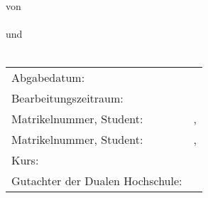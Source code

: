 \thispagestyle{empty}
\begin{titlepage}
\enlargethispage{4cm}

\vspace*{0.1cm}

\begin{center}
	\Huge{\textbf{\titel}}\\[1.5cm]
	\LARGE{\textbf{\arbeit}}\\[1cm]
	\normalsize{von}\\[1ex] \Large{\textbf{\autorOne}} \\[1ex]
	\normalsize{und}\\[1ex] \Large{\textbf{\autorTwo}} \\[1cm]
\end{center}

\begin{center}
	\vfill
	\begin{tabular}{ll}
		Abgabedatum:                     & \abgabe \\[0.2cm]
		Bearbeitungszeitraum:            & \bearbeitungszeitraum \\[0.2cm]
		Matrikelnummer, Student:            & \matrikelnrOne{}, \autorOne \\[0.2cm]
		Matrikelnummer, Student:            & \matrikelnrTwo{}, \autorTwo \\[0.2cm]
		Kurs:            & \kurs \\[0.2cm]
		Gutachter der Dualen Hochschule: & \betreuerDhbw \\[2cm]
	\end{tabular} 
\end{center}
\end{titlepage}
